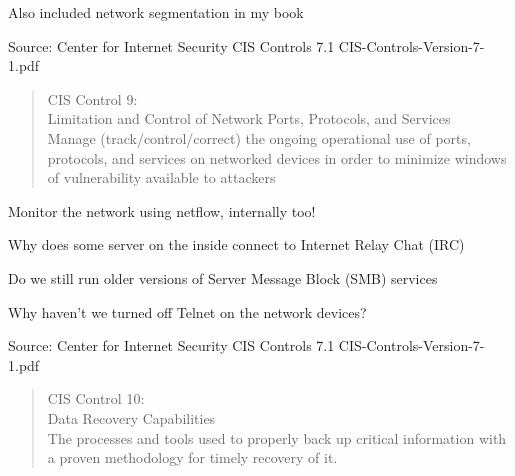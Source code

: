 \documentclass[Screen16to9,17pt]{foils}
\begin{document}
\begin{list1}
\item Also included network segmentation in my book
\item
\item
\item
\end{list1}

Source: Center for Internet Security CIS Controls 7.1 CIS-Controls-Version-7-1.pdf


\begin{quote}
CIS Control 9:\\
Limitation and Control of Network Ports,
Protocols, and Services\\
Manage (track/control/correct) the ongoing operational use of ports, protocols, and services on networked devices in order to minimize windows of vulnerability available to attackers
\end{quote}

\begin{list1}
\item Monitor the network using netflow, internally too!
\item Why does some server on the inside connect to Internet Relay Chat (IRC)
\item Do we still run older versions of Server Message Block (SMB) services
\item Why haven't we turned off Telnet on the network devices?
\end{list1}

Source: Center for Internet Security CIS Controls 7.1 CIS-Controls-Version-7-1.pdf


\begin{quote}
CIS Control 10:\\
Data Recovery Capabilities\\
The processes and tools used to properly back up critical information with a proven methodology for timely recovery of it.
\end{quote}

\begin{list1}
\item
\item
\item
\item
\end{list1}
\end{document}
